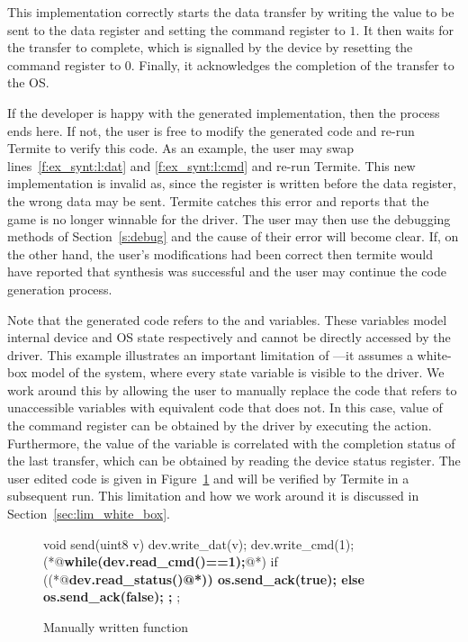 This implementation correctly starts the data transfer by writing the value to be sent to the data register and setting the command register to $1$.  It then waits for the transfer to complete, which is signalled by the device by resetting the command register to $0$.  Finally, it acknowledges the completion of the transfer to the OS.

If the developer is happy with the generated implementation, then the process ends here. If not, the user is free to modify the generated code and re-run Termite to verify this code. As an example, the user may swap lines~\ref{f:ex_synt:l:dat} and \ref{f:ex_synt:l:cmd} and re-run Termite. This new implementation is invalid as, since the  register is written before the data register, the wrong data may be sent. Termite catches this error and reports that the game is no longer winnable for the driver. The user may then use the debugging methods of Section~\ref{s:debug} and the cause of their error will become clear. If, on the other hand, the user's modifications had been correct then termite would have reported that synthesis was successful and the user may continue the code generation process.

Note that the generated code refers to the  and  variables.  These variables model internal device and OS state respectively and cannot be directly accessed by the driver.  This example illustrates an important limitation of \termite---it assumes a white-box model of the system, where every state variable is visible to the driver. We work around this by allowing the user to manually replace the code that refers to unaccessible variables with equivalent code that does not. In this case, value of the command register can be obtained by the driver by executing the  action.  Furthermore, the value of the  variable is correlated with the completion status of the last transfer, which can be obtained by reading the device status register. The user edited code is given in Figure~\ref{f:ex_man_send} and will be verified by Termite in a subsequent run. This limitation and how we work around it is discussed in Section~\ref{sec:lim_white_box}.

\begin{figure}
\begin{tsllisting}
void send(uint8 v){
    dev.write_dat(v); 
    dev.write_cmd(1); 
    (*@{\bf\ttfamily while(dev.read\_cmd()==1){};}@*)
    if ((*@\bf\ttfamily dev.read\_status()@*)) {
        os.send_ack(true);
    } else {
        os.send_ack(false);
    };
};
\end{tsllisting}
\caption{Manually written  function}
\label{f:ex_man_send}
\end{figure}


